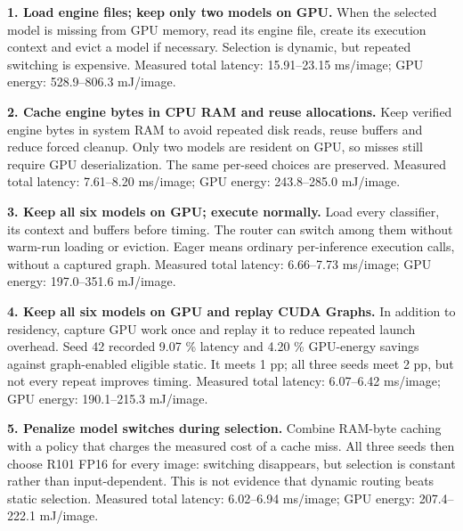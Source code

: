 \textbf{1. Load engine files; keep only two models on GPU.} When the selected model is missing from GPU memory, read its engine file, create its execution context and evict a model if necessary. Selection is dynamic, but repeated switching is expensive. Measured total latency: 15.91--23.15 ms/image; GPU energy: 528.9--806.3 mJ/image.

\textbf{2. Cache engine bytes in CPU RAM and reuse allocations.} Keep verified engine bytes in system RAM to avoid repeated disk reads, reuse buffers and reduce forced cleanup. Only two models are resident on GPU, so misses still require GPU deserialization. The same per-seed choices are preserved. Measured total latency: 7.61--8.20 ms/image; GPU energy: 243.8--285.0 mJ/image.

\textbf{3. Keep all six models on GPU; execute normally.} Load every classifier, its context and buffers before timing. The router can switch among them without warm-run loading or eviction. Eager means ordinary per-inference execution calls, without a captured graph. Measured total latency: 6.66--7.73 ms/image; GPU energy: 197.0--351.6 mJ/image.

\textbf{4. Keep all six models on GPU and replay CUDA Graphs.} In addition to residency, capture GPU work once and replay it to reduce repeated launch overhead. Seed 42 recorded 9.07 \% latency and 4.20 \% GPU-energy savings against graph-enabled eligible static. It meets 1 pp; all three seeds meet 2 pp, but not every repeat improves timing. Measured total latency: 6.07--6.42 ms/image; GPU energy: 190.1--215.3 mJ/image.

\textbf{5. Penalize model switches during selection.} Combine RAM-byte caching with a policy that charges the measured cost of a cache miss. All three seeds then choose R101 FP16 for every image: switching disappears, but selection is constant rather than input-dependent. This is not evidence that dynamic routing beats static selection. Measured total latency: 6.02--6.94 ms/image; GPU energy: 207.4--222.1 mJ/image.
